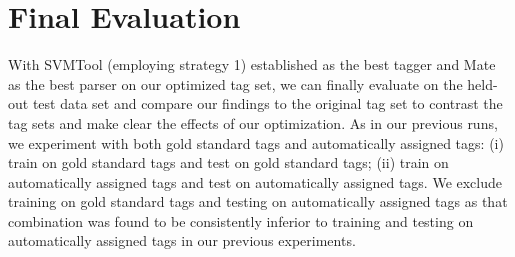 \documentclass[a4paper,12pt,english]{book}
\begin{document}


\section{Final Evaluation}
With SVMTool (employing strategy 1) established as the best tagger and Mate as
the best parser on our optimized tag set, we can finally evaluate on the
held-out test data set and compare our findings to the original tag set to
contrast the tag sets and make clear the effects of our optimization. As in our
previous runs, we experiment with both gold standard tags and automatically
assigned tags: (i) train on gold standard tags and test on gold standard tags;
(ii) train on automatically assigned tags and test on automatically assigned
tags. We exclude training on gold standard tags and testing on automatically
assigned tags as that combination was found to be consistently inferior to
training and testing on automatically assigned tags in our previous
experiments.
\end{document}
